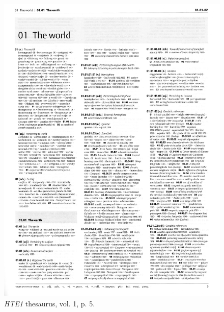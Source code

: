 \begin{figure}[htbp]
  \centering
    \includegraphics[width=\linewidth]{Stolk_thes-content/fig/thes/HTE1-p0005.jpg}
  \caption{\textit{HTE1} thesaurus, vol. 1, p. 5.}
  \label{fig:1.A:HTE1:thesaurus}
\end{figure}

